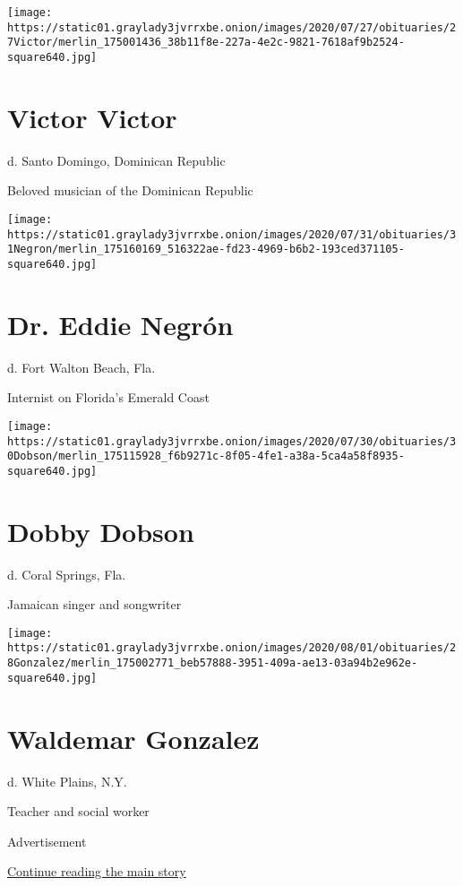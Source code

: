 \texttt{[image: https://static01.graylady3jvrrxbe.onion/images/2020/07/27/obituaries/27Victor/merlin\_175001436\_38b11f8e-227a-4e2c-9821-7618af9b2524-square640.jpg]}

\hypertarget{victor-victor}{%
\section{Victor Victor}\label{victor-victor}}

d. Santo Domingo, Dominican Republic

Beloved musician of the Dominican Republic

\texttt{[image: https://static01.graylady3jvrrxbe.onion/images/2020/07/31/obituaries/31Negron/merlin\_175160169\_516322ae-fd23-4969-b6b2-193ced371105-square640.jpg]}

\hypertarget{dr-eddie-negruxf3n}{%
\section{Dr. Eddie Negrón}\label{dr-eddie-negruxf3n}}

d. Fort Walton Beach, Fla.

Internist on Florida's Emerald Coast

\texttt{[image: https://static01.graylady3jvrrxbe.onion/images/2020/07/30/obituaries/30Dobson/merlin\_175115928\_f6b9271c-8f05-4fe1-a38a-5ca4a58f8935-square640.jpg]}

\hypertarget{dobby-dobson}{%
\section{Dobby Dobson}\label{dobby-dobson}}

d. Coral Springs, Fla.

Jamaican singer and songwriter

\texttt{[image: https://static01.graylady3jvrrxbe.onion/images/2020/08/01/obituaries/28Gonzalez/merlin\_175002771\_beb57888-3951-409a-ae13-03a94b2e962e-square640.jpg]}

\hypertarget{waldemar-gonzalez}{%
\section{Waldemar Gonzalez}\label{waldemar-gonzalez}}

d. White Plains, N.Y.

Teacher and social worker

Advertisement

\protect\hyperlink{after-bottom}{Continue reading the main story}

